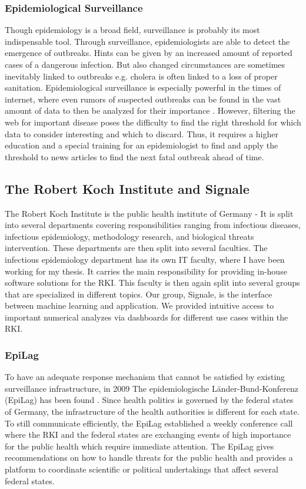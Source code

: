 \subsubsection{Epidemiological Surveillance}

Though epidemiology is a broad field, surveillance is probably its most indispensable tool. Through surveillance,
epidemiologists are able to detect the emergence of outbreaks. Hints can be given by an increased amount of reported cases of a dangerous infection. But also changed circumstances are sometimes inevitably linked to outbreaks e.g. cholera is often linked to a loss of proper sanitation. Epidemiological surveillance is especially powerful in the times of internet, where even rumors of suspected outbreaks can be found in the vast amount of data to then be analyzed for their importance \cite{EpiSurv}. However, filtering the web for important disease poses the difficulty to find the right threshold for which data to consider interesting and which to discard. Thus, it requires a higher education and a special training for an epidemiologist to find and apply the threshold to news articles to find the next fatal outbreak ahead of time.

\subsection{The Robert Koch Institute and Signale}
The Robert Koch Institute is the public health institute of Germany - It is
split into several departments covering responsibilities ranging from infectious diseases, infectious epidemiology, methodology research, and biological threats intervention.
These departments are then split into several faculties. The infectious epidemiology department has its own IT faculty,
where I have been working for my thesis. It carries the main responsibility for providing in-house software solutions for the RKI. This faculty is then again split into several groups that are specialized in different topics.
Our group, Signale, is the interface between machine learning and application.
We provided intuitive access to important numerical analyzes via dashboards for different use cases within the RKI.

\subsubsection{EpiLag}
To have an adequate response mechanism that cannot be satisfied by existing surveillance infrastructure, in 2009 The epidemiologische L\"ander-Bund-Konferenz (\gls{EpiLag}) has been found \cite{Mohr2010}. Since health politics is governed by the federal states of Germany, the infrastructure of the health authorities is different for each state. To still communicate efficiently, the EpiLag established a weekly conference call where the RKI and the federal states are exchanging events of high importance for the public health which require immediate attention. The EpiLag gives recommendations on how to handle threats for the public health and provides a platform to coordinate scientific or political undertakings that affect several federal states.

